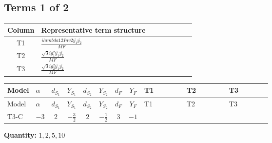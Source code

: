 \documentclass[8pt]{article}
\begin{document}
\begin{landscape}
\subsection*{Terms 1 of 2}
\begin{center}
\begin{tabular}{@{}c >{\raggedright\arraybackslash}p{0.82\linewidth}@{}}
\toprule
Column & Representative term structure \\
\midrule
T1 & \(\displaystyle \frac{i lambda12Inv2 \overline{y_{1}} \overline{y_{2}}}{MF}\) \\
\midrule
T2 & \(\displaystyle \frac{\sqrt{3} i g_{1}^{2} \overline{y_{1}} \overline{y_{2}}}{MF}\) \\
\midrule
T3 & \(\displaystyle \frac{\sqrt{3} i g_{2}^{2} \overline{y_{1}} \overline{y_{2}}}{MF}\) \\
\midrule
\bottomrule
\end{tabular}
\end{center}
\smallskip
\tiny
\begin{longtable}{@{}llcccccc >{\raggedright\arraybackslash}p{0.21\linewidth} >{\raggedright\arraybackslash}p{0.21\linewidth} >{\raggedright\arraybackslash}p{0.21\linewidth}@{}}
\toprule
Model & $\alpha$ & $d_{S_1}$ & $Y_{S_1}$ & $d_{S_2}$ & $Y_{S_2}$ & $d_F$ & $Y_F$ & T1 & T2 & T3 \\
\midrule
\endfirsthead
\toprule
Model & $\alpha$ & $d_{S_1}$ & $Y_{S_1}$ & $d_{S_2}$ & $Y_{S_2}$ & $d_F$ & $Y_F$ & T1 & T2 & T3 \\
\midrule
\endhead
T3-C & $-3$ & $2$ & $-\frac{3}{2}$ & $2$ & $-\frac{1}{2}$ & $3$ & $-1$ & \scriptsize\adjustbox{max width=\linewidth}{$\begin{gathered} - \frac{i lambda12Inv2 \overline{y_{1}} \overline{y_{2}}}{6 MF}\end{gathered}$} & \scriptsize\adjustbox{max width=\linewidth}{$\begin{gathered} - \frac{\sqrt{3} i g_{1}^{2} \overline{y_{1}} \overline{y_{2}}}{4 MF}\end{gathered}$} & \scriptsize\adjustbox{max width=\linewidth}{$\begin{gathered} - \frac{\sqrt{3} i g_{2}^{2} \overline{y_{1}} \overline{y_{2}}}{8 MF}\end{gathered}$} \\
\midrule
\bottomrule
\end{longtable}
\clearpage
\noindent\textbf{Quantity: }$\mathrm{1,2,5,10}$\par\smallskip

\end{landscape}
\end{document}
